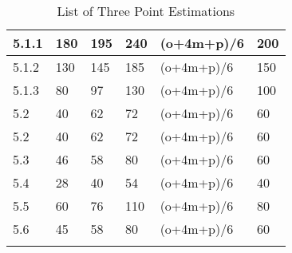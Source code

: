 \begin{longtable}[H]{C{1.5cm} C{2cm} C{2cm} C{2cm} C{3cm} C{2cm} }
		5.1.1 & 180 & 195 & 240 & (o+4m+p)/6 & 200\\ \midrule
		
		5.1.2 & 130 & 145 & 185 & (o+4m+p)/6 & 150\\ \midrule
		
		5.1.3 & 80 & 97 & 130 & (o+4m+p)/6 & 100\\ \midrule
		
		5.2 & 40 & 62 & 72 & (o+4m+p)/6 & 60\\ \midrule
		
		5.2 & 40 & 62 & 72 & (o+4m+p)/6 & 60\\ \midrule
		
		5.3 & 46 & 58 & 80 & (o+4m+p)/6 & 60\\ \midrule
		
		5.4 & 28 & 40 & 54 & (o+4m+p)/6 & 40\\ \midrule
		
		5.5 & 60 & 76 & 110 & (o+4m+p)/6 & 80\\ \midrule
		
		5.6 & 45 & 58 & 80 & (o+4m+p)/6 & 60\\ \midrule
		
    \bottomrule[2pt]
	\caption{List of Three Point Estimations}

\end{longtable}
	
	
